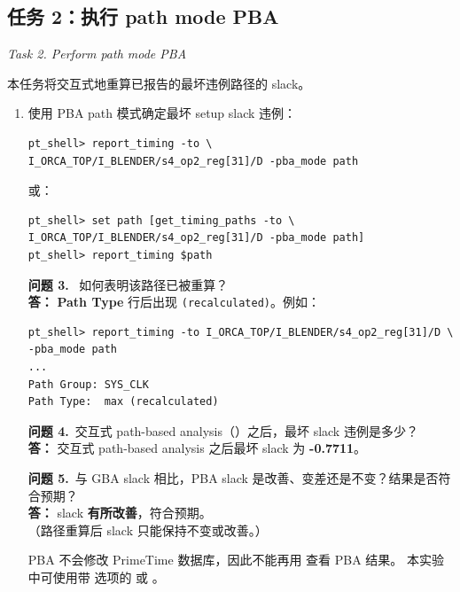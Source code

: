\subsection{任务 2：执行 path mode PBA}
\label{lab7:task2}

\noindent\textit{Task 2. Perform path mode PBA}

本任务将交互式地重算已报告的最坏违例路径的 slack。

\begin{enumerate}
  \item 使用 PBA path 模式确定最坏 setup slack 违例：
\begin{lstlisting}
pt_shell> report_timing -to \
I_ORCA_TOP/I_BLENDER/s4_op2_reg[31]/D -pba_mode path
\end{lstlisting}

  或：
\begin{lstlisting}
pt_shell> set path [get_timing_paths -to \
I_ORCA_TOP/I_BLENDER/s4_op2_reg[31]/D -pba_mode path]
pt_shell> report_timing $path
\end{lstlisting}

\begin{questionBox}
\textbf{问题 3.}\  如何表明该路径已被重算？\\[0.35em]
\textbf{答：} \textbf{Path Type} 行后出现 \texttt{(recalculated)}。例如：
\begin{lstlisting}
pt_shell> report_timing -to I_ORCA_TOP/I_BLENDER/s4_op2_reg[31]/D \
-pba_mode path
...
Path Group: SYS_CLK
Path Type:  max (recalculated)
\end{lstlisting}

\textbf{问题 4.}\ 交互式 path-based analysis（）之后，最坏 slack 违例是多少？\\[0.35em]
\textbf{答：} 交互式 path-based analysis 之后最坏 slack 为 \textbf{-0.7711}。

\textbf{问题 5.}\ 与 GBA slack 相比，PBA slack 是改善、变差还是不变？结果是否符合预期？\\[0.35em]
\textbf{答：} slack \textbf{有所改善}，符合预期。\\
（路径重算后 slack 只能保持不变或改善。）
\end{questionBox}

\begin{noteBox}
PBA 不会修改 PrimeTime 数据库，因此不能再用  查看 PBA 结果。
本实验中可使用带  选项的  或 。
\end{noteBox}
\end{enumerate}

